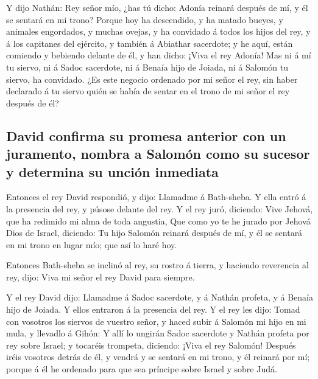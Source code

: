  Y dijo Nathán: Rey señor mío, ¿has tú dicho: Adonía
reinará después de mí, y él se sentará en mi trono? 
Porque hoy ha descendido, y ha matado bueyes, y animales engordados, y
muchas ovejas, y ha convidado á todos los hijos del rey, y á los
capitanes del ejército, y también á Abiathar sacerdote; y he aquí, están
comiendo y bebiendo delante de él, y han dicho: ¡Viva el rey Adonía!
 Mas ni á mí tu siervo, ni á Sadoc sacerdote, ni á Benaía
hijo de Joiada, ni á Salomón tu siervo, ha convidado. 
¿Es este negocio ordenado por mi señor el rey, sin haber declarado á tu
siervo quién se había de sentar en el trono de mi señor el rey después
de él?

\hypertarget{david-confirma-su-promesa-anterior-con-un-juramento-nombra-a-salomuxf3n-como-su-sucesor-y-determina-su-unciuxf3n-inmediata}{%
\subsection{David confirma su promesa anterior con un juramento, nombra
a Salomón como su sucesor y determina su unción
inmediata}\label{david-confirma-su-promesa-anterior-con-un-juramento-nombra-a-salomuxf3n-como-su-sucesor-y-determina-su-unciuxf3n-inmediata}}

 Entonces el rey David respondió, y dijo: Llamadme á
Bath-sheba. Y ella entró á la presencia del rey, y púsose delante del
rey.  Y el rey juró, diciendo: Vive Jehová, que ha
redimido mi alma de toda angustia,  Que como yo te he
jurado por Jehová Dios de Israel, diciendo: Tu hijo Salomón reinará
después de mí, y él se sentará en mi trono en lugar mío; que así lo haré
hoy.

 Entonces Bath-sheba se inclinó al rey, su rostro á
tierra, y haciendo reverencia al rey, dijo: Viva mi señor el rey David
para siempre.

 Y el rey David dijo: Llamadme á Sadoc sacerdote, y á
Nathán profeta, y á Benaía hijo de Joiada. Y ellos entraron á la
presencia del rey.  Y el rey les dijo: Tomad con vosotros
los siervos de vuestro señor, y haced subir á Salomón mi hijo en mi
mula, y llevadlo á Gihón:  Y allí lo ungirán Sadoc
sacerdote y Nathán profeta por rey sobre Israel; y tocaréis trompeta,
diciendo: ¡Viva el rey Salomón!  Después iréis vosotros
detrás de él, y vendrá y se sentará en mi trono, y él reinará por mí;
porque á él he ordenado para que sea príncipe sobre Israel y sobre Judá.

